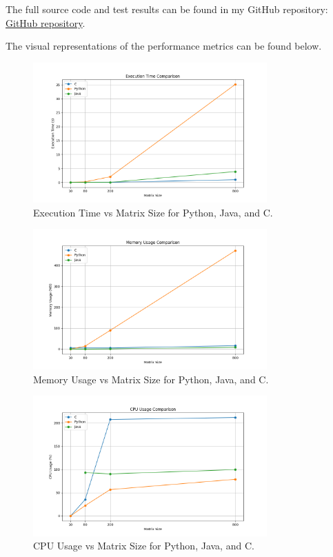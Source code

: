 \documentclass{article}
\begin{document}
The full source code and test results can be found in my GitHub repository: \href{https://github.com/kubajaz/BIG_DATA_INDIVIDUAL_TASKS_JAKUB_JAZDZYK}{GitHub repository}.

The visual representations of the performance metrics can be found below.

\begin{figure}[h!]
    \centering
    \includegraphics[width=0.8\textwidth]{execution_time_comparison.png}
    \caption{Execution Time vs Matrix Size for Python, Java, and C.}
    \label{fig:execution_time_plot}
\end{figure}

\begin{figure}[h!]
    \centering
    \includegraphics[width=0.8\textwidth]{memory_usage_comparison.png}
    \caption{Memory Usage vs Matrix Size for Python, Java, and C.}
    \label{fig:memory_usage_plot}
\end{figure}

\begin{figure}[h!]
    \centering
    \includegraphics[width=0.8\textwidth]{cpu_usage_comparison.png}
    \caption{CPU Usage vs Matrix Size for Python, Java, and C.}
    \label{fig:cpu_usage_plot}
\end{figure}
\end{document}
